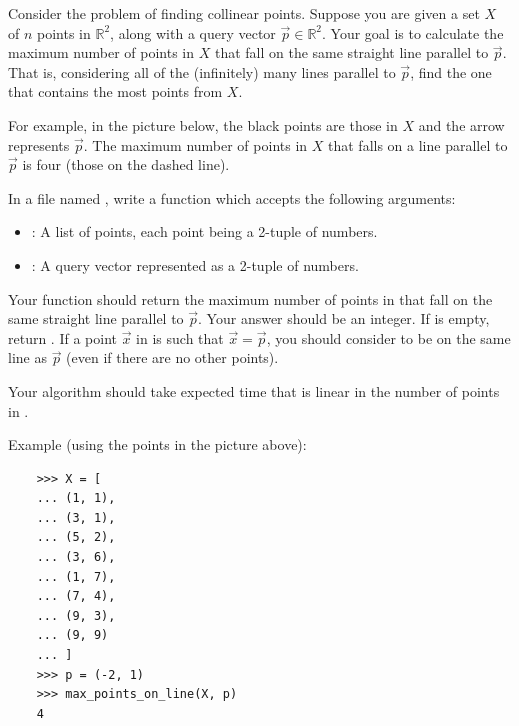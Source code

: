 \begin{prob}


    Consider the problem of finding collinear points.
    Suppose you are given a set $X$ of $n$ points in $\mathbb R^2$, along with a query 
    vector $\vec p \in \mathbb R^2$. Your goal is to calculate the maximum
    number of points in $X$ that fall on the same straight line parallel to $\vec{p}$.
    That is, considering all of the (infinitely) many lines parallel to $\vec p$,
    find the one that contains the most points from $X$.

    For example, in the picture below, the black points are those in $X$ and the arrow
    represents $\vec p$. The maximum number of points in $X$ that falls on a line
    parallel to $\vec p$ is four (those on the dashed line).

    \begin{center}
    \resizebox{3in}{!}{
        
    }
    \end{center}

    In a file named , write a function
     which accepts the following arguments:
    \begin{itemize}
        \item {}: A list of points, each point being a 2-tuple of numbers.
        \item {}: A query vector represented as a 2-tuple of numbers.
    \end{itemize}
    Your function should return the maximum number of points in  that fall
    on the same straight line parallel to $\vec p$. Your answer should be an
    integer. If  is empty, return . If a point $\vec{x}$ in 
    is such that $\vec x = \vec p$, you should consider to be on the same line as $\vec{p}$
    (even if there are no other points).

    Your algorithm should take expected time that is linear in the number of points in
    .

    Example (using the points in the picture above):

    \begin{verbatim}
    >>> X = [
    ... (1, 1),
    ... (3, 1),
    ... (5, 2),
    ... (3, 6),
    ... (1, 7),
    ... (7, 4),
    ... (9, 3),
    ... (9, 9)
    ... ]
    >>> p = (-2, 1)
    >>> max_points_on_line(X, p)
    4
    \end{verbatim}


\end{prob}
